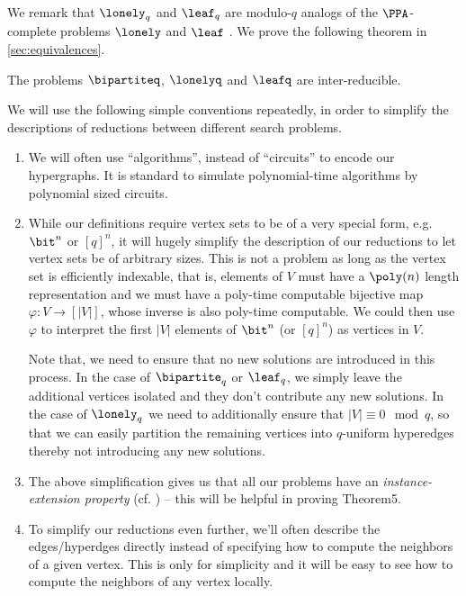 \noindent We remark that $\lonely_q$ and $\leaf_q$ are modulo-$q$ analogs of the $\PPA$-complete problems $\lonely$ and $\leaf$ \cite{r33,r5}. We prove the following theorem in \autoref{sec:equivalences}.

\begin{theorem}\label{thm:PPAqEquivalentProblems}
The problems $\bipartiteq$, $\lonelyq$ and $\leafq$ are inter-reducible.
\end{theorem}

\begin{remark}\label{rem:simplifications}
	We will use the following simple conventions repeatedly, in order to simplify the descriptions of reductions between different search problems.
	\begin{enumerate}
						\item We will often use ``algorithms'', instead of ``circuits'' to encode our hypergraphs. It is standard to simulate polynomial-time algorithms by polynomial sized circuits.
		\item While our definitions require vertex sets to be of a very special form, e.g. $\bit^n$ or $[q]^n$, it will hugely simplify the description of our reductions to let vertex sets be of arbitrary sizes. This is not a problem as long as the vertex set is efficiently indexable, that is, elements of $V$ must have a $\poly(n)$ length representation and we must have a poly-time computable bijective map $\varphi : V \to [|V|]$, whose inverse is also poly-time computable. We could then use $\varphi$ to interpret the first $|V|$ elements of $\bit^n$ (or $[q]^n$) as vertices in $V$.

		Note that, we need to ensure that no new solutions are introduced in this process. In the case of $\bipartite_q$ or $\leaf_q$, we simply leave the additional vertices isolated and they don't contribute any new solutions. In the case of $\lonely_q$ we need to additionally ensure that $|V| \equiv 0 \mod{q}$, so that we can easily partition the remaining vertices into $q$-uniform hyperedges thereby not introducing any new solutions.
		\item The above simplification gives us that all our problems have an {\em instance-extension property} (cf. \cite{r10}) -- this will be helpful in proving Theorem5.
		\item To simplify our reductions even further, we'll often describe the edges/hyperdges directly instead of specifying how to compute the neighbors of a given vertex. This is only for simplicity and it will be easy to see how to compute the neighbors of any vertex locally.
	\end{enumerate}
\end{remark}

